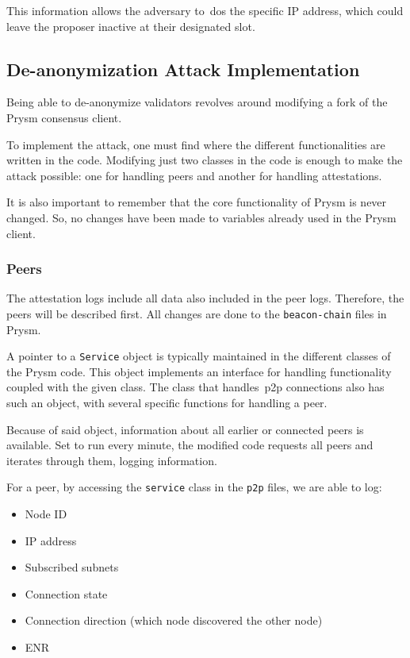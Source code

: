 This information allows the adversary to~\gls{dos} the specific IP address, which could leave the proposer inactive at their designated slot.

\subsection{De-anonymization Attack Implementation}\label{subsec:attack-implementation}
Being able to de-anonymize validators revolves around modifying a fork of the Prysm consensus client.

To implement the attack, one must find where the different functionalities are written in the code.
Modifying just two classes in the code is enough to make the attack possible: one for handling peers and another for handling attestations.

It is also important to remember that the core functionality of Prysm is never changed.
So, no changes have been made to variables already used in the Prysm client.




\subsubsection{Peers}\label{subsubsec:peers}
The attestation logs include all data also included in the peer logs.
Therefore, the peers will be described first.
All changes are done to the \texttt{beacon-chain} files in Prysm.

A pointer to a \texttt{Service} object is typically maintained in the different classes of the Prysm code.
This object implements an interface for handling functionality coupled with the given class.
The class that handles~\gls{p2p} connections also has such an object, with several specific functions for handling a peer.

Because of said object, information about all earlier or connected peers is available.
Set to run every minute, the modified code requests all peers and iterates through them,
logging information.

For a peer, by accessing the \texttt{service} class in the \texttt{p2p} files, we are able to log:
\begin{itemize}
     \item Node ID
     \item IP address
     \item Subscribed subnets
     \item Connection state
     \item Connection direction (which node discovered the other node)
     \item ENR
\end{itemize}


